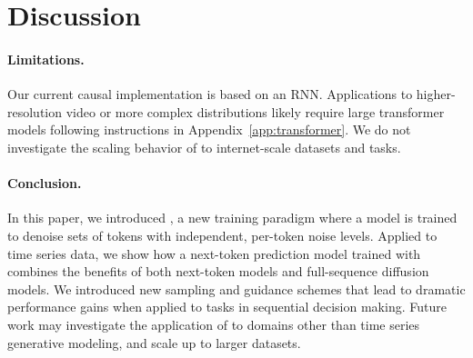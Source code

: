 \section{Discussion}
\label{sec:discussion}
\paragraph{Limitations.} Our current causal implementation is based on an RNN. Applications to higher-resolution video or more complex distributions likely require large transformer models following instructions in Appendix~\ref{app:transformer}. We do not investigate the scaling behavior of \algo{} to internet-scale datasets and tasks. 
\paragraph{Conclusion.} In this paper, we introduced \algo{}, a new training paradigm where a model is trained to denoise sets of tokens with independent, per-token noise levels.
Applied to time series data, we show how a next-token prediction model trained with \algo{} combines the benefits of both next-token models and full-sequence diffusion models.
We introduced new sampling and guidance schemes that lead to dramatic performance gains when applied to tasks in sequential decision making.
Future work may investigate the application of \algo{} to domains other than time series generative modeling, and scale up \algo{} to larger datasets.
